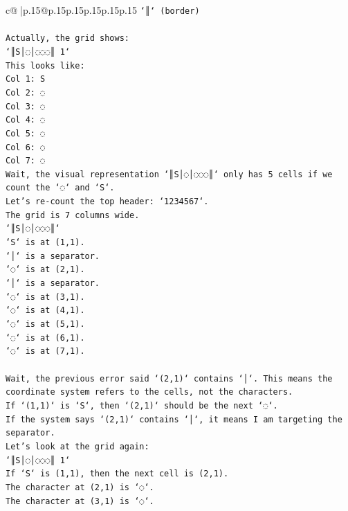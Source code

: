 \documentclass{article}
\begin{document}
{\begin{supertabular}{c@{$\;$}|p{.15\linewidth}@{}p{.15\linewidth}p{.15\linewidth}p{.15\linewidth}p{.15\linewidth}p{.15\linewidth}}
{{{\texttt{`║` (border)} \\
\\ 
\texttt{Actually, the grid shows:} \\
\texttt{`║S│◌│◌◌◌║ 1`} \\
\texttt{This looks like:} \\
\texttt{Col 1: S} \\
\texttt{Col 2: ◌} \\
\texttt{Col 3: ◌} \\
\texttt{Col 4: ◌} \\
\texttt{Col 5: ◌} \\
\texttt{Col 6: ◌} \\
\texttt{Col 7: ◌} \\
\texttt{Wait, the visual representation `║S│◌│◌◌◌║` only has 5 cells if we count the `◌` and `S`.} \\
\texttt{Let's re{-}count the top header: `1234567`.} \\
\texttt{The grid is 7 columns wide.} \\
\texttt{`║S│◌│◌◌◌║`} \\
\texttt{`S` is at (1,1).} \\
\texttt{`│` is a separator.} \\
\texttt{`◌` is at (2,1).} \\
\texttt{`│` is a separator.} \\
\texttt{`◌` is at (3,1).} \\
\texttt{`◌` is at (4,1).} \\
\texttt{`◌` is at (5,1).} \\
\texttt{`◌` is at (6,1).} \\
\texttt{`◌` is at (7,1).} \\
\\ 
\texttt{Wait, the previous error said `(2,1)` contains `│`. This means the coordinate system refers to the cells, not the characters.} \\
\texttt{If `(1,1)` is `S`, then `(2,1)` should be the next `◌`.} \\
\texttt{If the system says `(2,1)` contains `│`, it means I am targeting the separator.} \\
\texttt{Let's look at the grid again:} \\
\texttt{`║S│◌│◌◌◌║ 1`} \\
\texttt{If `S` is (1,1), then the next cell is (2,1).} \\
\texttt{The character at (2,1) is `◌`.} \\
\texttt{The character at (3,1) is `◌`.} \\
}}}
\end{supertabular}}
\end{document}
